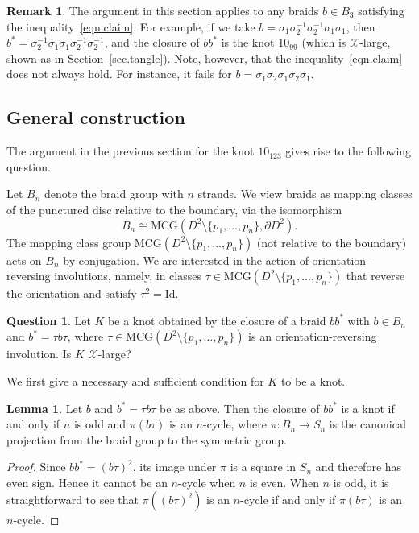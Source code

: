 \documentclass[12pt,reqno]{amsart}
\theoremstyle{definition}
\newtheorem{lemma}[theorem]{Lemma}
\newtheorem{remark}[theorem]{Remark}
\newtheorem*{question*}{Question}
\def\calX{\mathcal X}
\begin{document}
\begin{remark}
    The argument in this section applies to any braids $b \in B_3$ satisfying the inequality~\eqref{eqn.claim}. For example, if we take $b = \sigma_1 \sigma_2^{-1}\sigma_2^{-1} \sigma_1 \sigma_1$, then $b^\ast = \sigma_2^{-1} \sigma _1 \sigma_1 \sigma_2^{-1} \sigma_2^{-1}$, and the closure of $bb^\ast$ is the knot $10_{99}$ (which is $\calX$-large, shown as in Section~\ref{sec.tangle}). Note, however, that the inequality~\eqref{eqn.claim} does not always hold. For instance, it fails for $b= \sigma_1 \sigma_2 \sigma_1 \sigma_2 \sigma_1$.
\end{remark}

\subsection{General construction}
\label{sec.sym}

The argument in the previous section for the knot $10_{123}$ gives rise to the following question.

Let $B_n$ denote the braid group with $n$ strands. We view braids as mapping classes of
the punctured disc relative to the boundary, via the isomorphism
$$
B_n\cong\mathrm{MCG}(D^2 \setminus \{p_1,\dotsc,p_n\}, \partial D^2).
$$
The mapping class group $\mathrm{MCG}(D^2 \setminus \{p_1,\dotsc,p_n\})$ 
(not relative to the boundary)  acts on $B_n$ by conjugation. We are 
interested in the action of orientation-reversing involutions, 
namely, in classes  $\tau\in \mathrm{MCG}(D^2 \setminus \{p_1,\dotsc,p_n\})$ 
that reverse the orientation and satisfy $\tau^2=\mathrm{Id}$.

\begin{question*}
Let $K$ be a knot obtained by the closure of a braid $b b^*$ with
$b\in B_n$ and $b^*=\tau b\tau$, where $\tau\in \mathrm{MCG}(D^2 \setminus \{p_1,\dotsc,p_n\})$
is an orientation-reversing involution.  Is $K$ $\mathcal X$-large?
\end{question*}

We first give a necessary and sufficient condition for $K$ to be a knot.
\begin{lemma}
\label{lem.bt}
    Let $b$ and $b^\ast = \tau b \tau$ be as above. Then
    the closure of $b b^\ast$ is a knot if and only if $n$ is odd and $\pi(b\tau)$ is an $n$-cycle, where $\pi : B_n \rightarrow S_n$ is the canonical projection from the braid group to the symmetric group.
\end{lemma}
\begin{proof}
Since $b b^\ast = (b\tau)^2$, its image under $\pi$ is a square in $S_n$ and therefore has even sign.
Hence it cannot be an $n$-cycle when $n$ is even. 
When $n$ is odd, it is straightforward to see that $\pi ( (b\tau)^2)$ is an $n$-cycle if and only if $\pi(b \tau)$ is an $n$-cycle.
\end{proof}
\end{document}
